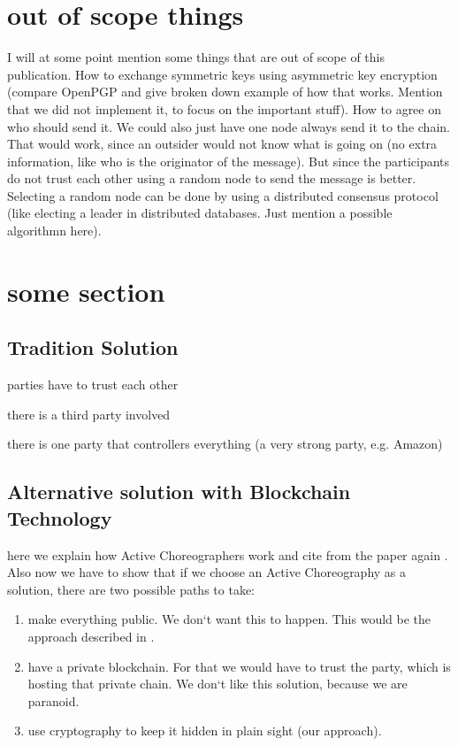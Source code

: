 \documentclass[runningheads]{llncs}
\begin{document}
\section{out of scope things}
I will at some point mention some things that are out of scope of this publication. How to exchange symmetric keys using asymmetric key encryption (compare OpenPGP and give broken down example of how that works. Mention that we did not implement it, to focus on the important stuff). How to agree on who should send it. We could also just have one node always send it to the chain. That would work, since an outsider would not know what is going on (no extra information, like who is the originator of the message). But since the participants do not trust each other using a random node to send the message is better. Selecting a random node can be done by using a distributed consensus protocol (like electing a leader in distributed databases. Just mention a possible algorithmn here).   



\section{some section}


\subsection{Tradition Solution}
parties have to trust each other 

there is a third party involved

there is one party that controllers everything (a very strong party, e.g. Amazon)


\subsection{Alternative solution with Blockchain Technology}
here we explain how Active Choreographers work and cite from the paper again \cite{weber2016untrusted}. Also now we have to show that if we choose an Active Choreography as a solution, there are two possible paths to take: 

\begin{enumerate}
    \item make everything public. We don`t want this to happen. This would be the approach described in \cite{weber2016untrusted}.
    \item have a private blockchain. For that we would have to trust the party, which is hosting that private chain. We don`t like this solution, because we are paranoid. 
    \item use cryptography to keep it hidden in plain sight (our approach).
\end{enumerate}
\end{document}

